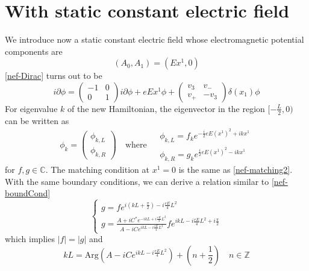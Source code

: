 \section{With static constant electric field}
We introduce now a static constant electric field whose electromagnetic potential components are 
\begin{equation*}
(A_0, A_1) = (E x^1, 0)
\end{equation*}
\cref{nef-Dirac} turns out to be
\begin{equation} 
i \partial \phi = 
\begin{pmatrix} 
-1 & 0 \\
0 & 1 
\end{pmatrix} i \partial \phi + eEx^1 \phi +
\begin{pmatrix}
v_3 & v_- \\
v_+ & -v_3
\end{pmatrix} \delta(x_1) \phi
\end{equation}
For eigenvalue $k$ of the new Hamiltonian, the eigenvector in the region $[-\frac{L}{2}, 0)$ can be written as 
\begin{equation}
\phi_k =\begin{pmatrix}
\phi_{k,L}  \\
\phi_{k,R}
\end{pmatrix}
\quad \textrm{where $\begin{split} 
 & \phi_{k,L} = f_k e^{-\frac{i}{2}eE(x^1)^2 + ikx^1} \\
& \phi_{k,R} = g_k e^{\frac{i}{2}eE(x^1)^2 - ikx^1}
\end{split}
$}
\end{equation}
for $f, g\in \mathbb{C}$. The matching condition at $x^1 = 0$ is the same as \cref{nef-matching2}. With the same boundary conditions, we can derive a relation similar to \cref{nef-boundCond}
\begin{equation}
\begin{cases}
g = fe^{i(kL + \frac{\pi}{2}) - i\frac{eE}{4}L^2}  \\
g = \frac{A + iC^* e^{-ikL + i\frac{eE}{4}L^2 }}{A - iC e^{ikL - i\frac{eE}{4}L^2}} fe^{ikL - i\frac{eE}{4}L^2 + i\frac{\pi}{2}}
\end{cases}
\end{equation}
which implies $|f| = |g|$ and
\begin{equation}
kL = \textrm{Arg}(A - iC e^{ikL -i\frac{eE}{4}L^2}) + (n + \frac{1}{2}) \quad n\in \mathbb{Z}
\end{equation}
